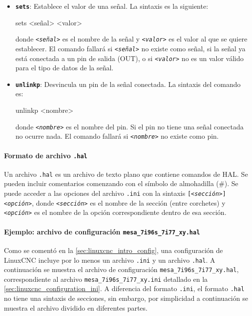 \documentclass[english,spanish,a4paper,11pt]{article}
\begin{document}
\begin{itemize}
    \item \textbf{\texttt{sets}}: Establece el valor de una señal. La sintaxis es la siguiente:
\begin{listingbox}[][language=example]
sets <señal> <valor>
\end{listingbox}
    donde \textit{\texttt{<señal>}} es el nombre de la señal y \textit{\texttt{<valor>}} es el valor al que se quiere establecer. El comando fallará si \textit{\texttt{<señal>}} no existe como señal, si la señal ya está conectada a un pin de salida (OUT), o si \textit{\texttt{<valor>}} no es un valor válido para el tipo de datos de la señal.

    \item \textbf{\texttt{unlinkp}}: Desvincula un pin de la señal conectada. La sintaxis del comando es:
\begin{listingbox}[][language=example]
unlinkp <nombre>
\end{listingbox}
    donde \textit{\texttt{<nombre>}} es el nombre del pin. Si el pin no tiene una señal conectada no ocurre nada. El comando fallará si \textit{\texttt{<nombre>}} no existe como pin.
\end{itemize}


\paragraph{Formato de archivo \texttt{.hal}}\hfill\medskip

Un archivo \texttt{.hal} es un archivo de texto plano que contiene comandos de \ac{HAL}. Se pueden incluir comentarios comenzando con el símbolo de almohadilla (\#). Se puede acceder a las opciones del archivo \texttt{.ini} con la sintaxis \texttt{[\textit{<sección>}]\textit{<opción>}}, donde \texttt{\textit{<sección>}} es el nombre de la sección (entre corchetes) y \texttt{\textit{<opción>}} es el nombre de la opción correspondiente dentro de esa sección.


\paragraph{Ejemplo: archivo de configuración \texttt{mesa\_7i96s\_7i77\_xy.hal}}\hfill\medskip

Como se comentó en la \cref{sec:linuxcnc_intro_config}, una configuración de LinuxCNC incluye por lo menos un archivo \texttt{.ini} y un archivo \texttt{.hal}. A continuación se muestra el archivo de configuración \texttt{mesa\_7i96s\_7i77\_xy.hal}, correspondiente al archivo \texttt{mesa\_7i96s\_7i77\_xy.ini} detallado en la \cref{sec:linuxcnc_configuration_ini}. A diferencia del formato \texttt{.ini}, el formato \texttt{.hal} no tiene una sintaxis de secciones, sin embargo, por simplicidad a continuación se muestra el archivo dividido en diferentes partes.
\end{document}
